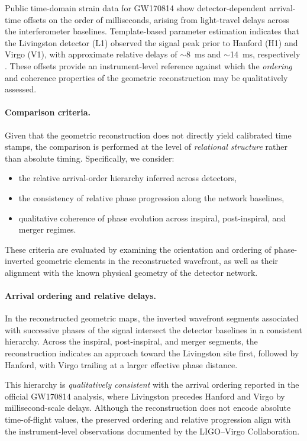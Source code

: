 \documentclass[11pt,a4paper]{article}
\begin{document}
Public time-domain strain data for GW170814 show detector-dependent arrival-time
offsets on the order of milliseconds, arising from light-travel delays across the
interferometer baselines.
Template-based parameter estimation indicates that the Livingston detector (L1)
observed the signal peak prior to Hanford (H1) and Virgo (V1), with approximate
relative delays of $\sim$8~ms and $\sim$14~ms, respectively
\cite{Abbott2019}.
These offsets provide an instrument-level reference against which the
\emph{ordering} and coherence properties of the geometric reconstruction may be
qualitatively assessed.

\paragraph{Comparison criteria.}
Given that the geometric reconstruction does not directly yield calibrated time
stamps, the comparison is performed at the level of \emph{relational structure}
rather than absolute timing.
Specifically, we consider:
\begin{itemize}
    \item the relative arrival-order hierarchy inferred across detectors,
    \item the consistency of relative phase progression along the network baselines,
    \item qualitative coherence of phase evolution across inspiral, post-inspiral,
          and merger regimes.
\end{itemize}

These criteria are evaluated by examining the orientation and ordering of
phase-inverted geometric elements in the reconstructed wavefront, as well as
their alignment with the known physical geometry of the detector network.

\paragraph{Arrival ordering and relative delays.}
In the reconstructed geometric maps, the inverted wavefront segments associated
with successive phases of the signal intersect the detector baselines in a
consistent hierarchy.
Across the inspiral, post-inspiral, and merger segments, the reconstruction
indicates an approach toward the Livingston site first, followed by Hanford, with
Virgo trailing at a larger effective phase distance.

This hierarchy is \emph{qualitatively consistent} with the arrival ordering
reported in the official GW170814 analysis, where Livingston precedes Hanford and
Virgo by millisecond-scale delays.
Although the reconstruction does not encode absolute time-of-flight values, the
preserved ordering and relative progression align with the instrument-level
observations documented by the LIGO--Virgo Collaboration.
\end{document}
